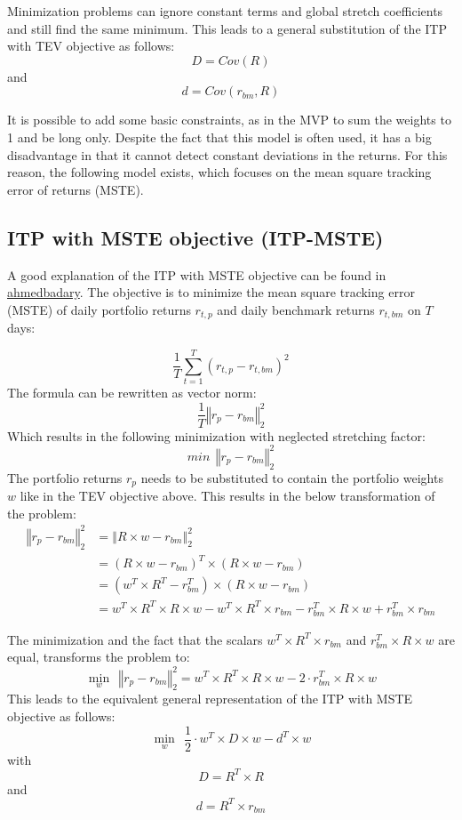 \documentclass[
  oneside]{book}
\begin{document}
Minimization problems can ignore constant terms and global stretch coefficients and still find the same minimum. This leads to a general substitution of the ITP with TEV objective as follows:
\[
  D = Cov(R)
\]
and
\[
d = Cov(r_{bm}, R)
\]

It is possible to add some basic constraints, as in the MVP to sum the weights to 1 and be long only. Despite the fact that this model is often used, it has a big disadvantage in that it cannot detect constant deviations in the returns. For this reason, the following model exists, which focuses on the mean square tracking error of returns (MSTE).

\hypertarget{itp-with-mste-objective-itp-mste}{%
\subsection{ITP with MSTE objective (ITP-MSTE)}\label{itp-with-mste-objective-itp-mste}}

A good explanation of the ITP with MSTE objective can be found in \href{https://ahmedbadary.github.io/work_files/research/conv_opt/hw/iftp}{ahmedbadary}. The objective is to minimize the mean square tracking error (MSTE) of daily portfolio returns \(r_{t, p}\) and daily benchmark returns \(r_{t, bm}\) on \(T\) days:

\[
  \frac{1}{T} \sum^T_{t=1}(r_{t, p}-r_{t, bm})^2
\]
The formula can be rewritten as vector norm:
\[
  \frac{1}{T} \left\Vert r_{p}-r_{bm} \right\Vert_2^2
\]
Which results in the following minimization with neglected stretching factor:
\[
 min \ \  \left\Vert r_{p}-r_{bm} \right\Vert_2^2
\]
The portfolio returns \(r_p\) needs to be substituted to contain the portfolio weights \(w\) like in the TEV objective above. This results in the below transformation of the problem:
\begin{align*}
  \left\Vert r_{p}-r_{bm} \right\Vert_2^2 &= \left\Vert R \times w-r_{bm} \right\Vert_2^2 \\ 
  &= (R \times w-r_{bm})^T \times (R \times w-r_{bm}) \\ 
  &= (w^T \times R^T-r_{bm}^T) \times (R \times w-r_{bm}) \\ 
  &= w^T \times R^T \times R \times w - w^T \times R^T \times r_{bm} - r_{bm}^T \times R \times w + r_{bm}^T \times r_{bm} 
\end{align*}

The minimization and the fact that the scalars \(w^T \times R^T \times r_{bm}\) and \(r_{bm}^T \times R \times w\) are equal, transforms the problem to:
\[
  \min\limits_{w} \ \  \left\Vert r_{p}-r_{bm} \right\Vert_2^2 
  = w^T \times R^T \times R \times w - 2\cdot r_{bm}^T \times R \times w
\]
This leads to the equivalent general representation of the ITP with MSTE objective as follows:
\[
  \min\limits_{w} \ \ \frac{1}{2} \cdot w^T \times D \times w - d^T \times w
\]
with
\[
D = R^T \times R
\]
and
\[
  d = R^T \times r_{bm}
\]
\end{document}

